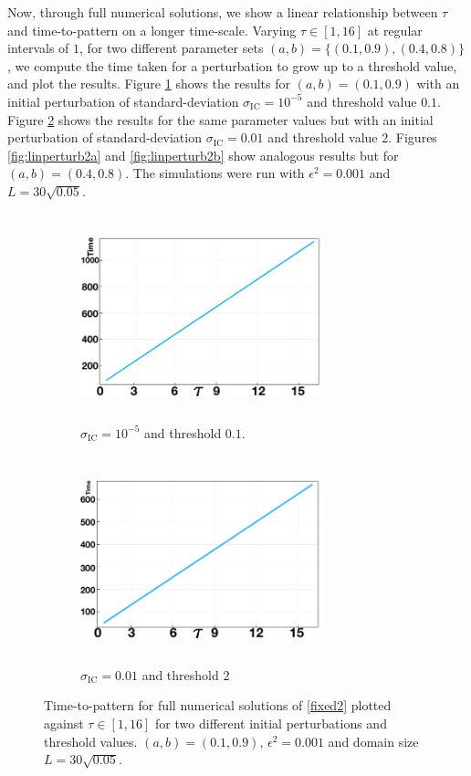 Now, through full numerical solutions, we show a linear relationship between $\tau$ and time-to-pattern on a longer time-scale. Varying $\tau\in[1,16]$ at regular intervals of $1$, for two different parameter sets $(a,b)=\{(0.1,0.9),(0.4,0.8)\}$, we compute the time taken for a perturbation to grow up to a threshold value, and plot the results. Figure \ref{fig:linperturb1a} shows the results for $(a,b)=(0.1,0.9)$ with an initial perturbation of standard-deviation $\sigma_{\text{IC}}=10^{-5}$ and threshold value $0.1$. Figure \ref{fig:linperturb1b} shows the results for the same parameter values but with an initial perturbation of standard-deviation $\sigma_{\text{IC}}=0.01$ and threshold value $2$. Figures \ref{fig:linperturb2a} and \ref{fig:linperturb2b} show analogous results but for $(a,b)=(0.4,0.8)$. The simulations were run with $\epsilon^2=0.001$ and $L=30\sqrt{0.05}$.
\begin{figure}[H]
    \centering
    \begin{subfigure}[b]{0.45\textwidth}
        \centering
        \includegraphics[width=7cm,height=6cm]{longlin2.png}
        \caption{$\sigma_{\text{IC}}=10^{-5}$ and threshold $0.1$.}
        \label{fig:linperturb1a}
    \end{subfigure}
    \hfill
    \begin{subfigure}[b]{0.45\textwidth}
        \centering
        \includegraphics[width=7cm,height=6cm]{longlin1.png}
        \caption{$\sigma_{\text{IC}}=0.01$ and threshold $2$}
        \label{fig:linperturb1b}
    \end{subfigure}
    \caption{Time-to-pattern for full numerical solutions of \eqref{fixed2} plotted against $\tau\in[1,16]$ for two different initial perturbations and threshold values. $(a,b)=(0.1,0.9)$, $\epsilon^2=0.001$ and domain size $L=30\sqrt{0.05}$.}
    \label{fig:linperturb1}
\end{figure}

